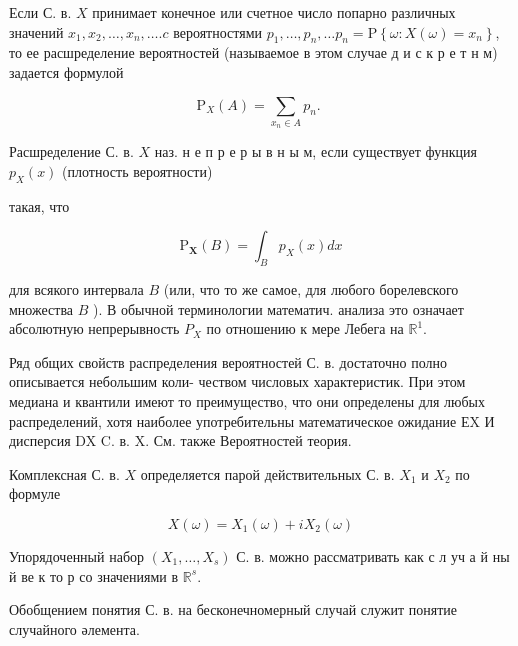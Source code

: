 \documentclass[10pt]{article}
\begin{document}
Если С. в. $X$ принимает конечное или счетное число попарно различных значений $x_{1}, x_{2}, \ldots, x_{n}, \ldots . c$ вероятностями $p_{1}, \ldots, p_{n}, \ldots p_{n}=\mathrm{P}\left\{\omega: X(\omega)=x_{n}\right\}$, то ее расшределение вероятностей (называемое в этом случае д и с к р е т н м) задается формулой



\[

\mathrm{P}_{X}(A)=\sum_{x_{n} \in A} p_{n} \text {. }

\]



Расшределение С. в. $X$ наз. н е п р е р ы в н ы м, если существует функция $p_{X}(x)$ (плотность вероятности)

такая, что



\[

\mathrm{P}_{\boldsymbol{X}}(B)=\int_{B} p_{X}(x) d x

\]



для всякого интервала $B$ (или, что то же самое, для любого борелевского множества $B$ ). В обычной терминологии математич. анализа это означает абсолютную непрерывность $P_{X}$ по отношению к мере Лебега на $\mathbb{R}^{1}$.



Ряд общих свойств распределения вероятностей С. в. достаточно полно описывается небольшим коли- чеством числовых характеристик. При этом медиана и квантили имеют то преимущество, что они определены для любых распределений, хотя наиболее употребительны математическое ожидание ЕX И дисперсия DX C. в. X. См. также Вероятностей теория.



Комплексная С. в. $X$ определяется парой действительных С. в. $X_{1}$ и $X_{2}$ по формуле



\[

X(\omega)=X_{1}(\omega)+i X_{2}(\omega)

\]



Упорядоченный набор $\left(X_{1}, \ldots, X_{s}\right)$ С. в. можно рассматривать как с л уч а й ны й ве к то р со значениями в $\mathbb{R}^{s}$.



Обобщением понятия С. в. на бесконечномерный случай служит понятие случайного әлемента.
\end{document}
